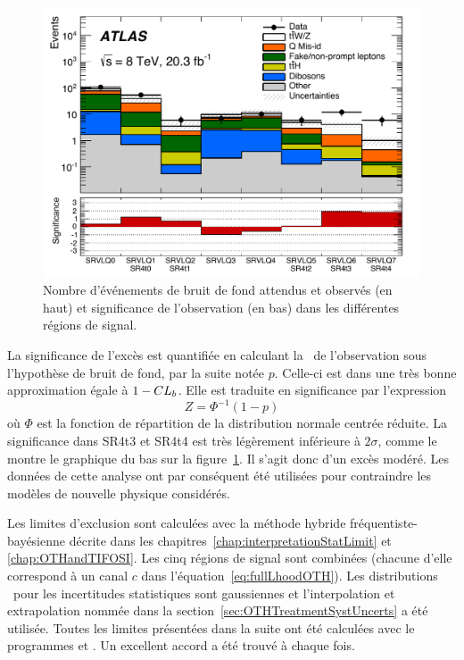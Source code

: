 \begin{figure}[!htb]
\begin{center}
\vspace*{-0.5cm}
\includegraphics[width=0.65\linewidth]{figures/paperSameSign/ExpectedBackgroundObeservedCategories.pdf}
\end{center}
\vspace*{-0.3cm}
\caption{Nombre d'\'ev\'enements de bruit de fond attendus et observ\'es (en haut) et significance de l'observation (en bas) dans les diff\'erentes r\'egions de signal.}
\label{fig:yieldsBkgSigPlusSignif}
\end{figure}

La significance de l'exc\`es est quantifi\'ee en calculant la \pval~de l'observation sous l'hypoth\`ese de bruit de fond, par la suite not\'ee $p$. 
Celle-ci est dans une tr\`es bonne approximation \'egale \`a $1-CL_b$. 
Elle est traduite en significance par l'expression
\[Z=\Phi^{-1}\left(1-p\right)\]
o\`u $\Phi$ est la fonction de r\'epartition de la distribution normale centr\'ee r\'eduite. 
La significance dans SR4t3 et SR4t4 est tr\`es l\'eg\`erement inf\'erieure \`a $2\sigma$, comme le montre le graphique du bas sur la figure~\ref{fig:yieldsBkgSigPlusSignif}. 
Il s'agit donc d'un exc\`es mod\'er\'e.
Les donn\'ees de cette analyse ont par cons\'equent \'et\'e utilis\'ees pour contraindre les mod\`eles de nouvelle physique consid\'er\'es. 

Les limites d'exclusion sont calcul\'ees avec la m\'ethode hybride fr\'equentiste-bay\'esienne d\'ecrite dans les chapitres~\ref{chap:interpretationStatLimit} et \ref{chap:OTHandTIFOSI}. 
Les cinq r\'egions de signal sont combin\'ees (chacune d'elle correspond \`a un canal $c$ dans l'\'equation~\ref{eq:fullLhoodOTH}). 
Les distributions \prior~pour les incertitudes statistiques sont gaussiennes et l'interpolation et extrapolation nomm\'ee \mclimit{} dans la section~\ref{sec:OTHTreatmentSystUncerts} a \'et\'e utilis\'ee. 
Toutes les limites pr\'esent\'ees dans la suite ont \'et\'e calcul\'ees avec le programmes \mclimit{} et \opthylic. Un excellent accord a \'et\'e trouv\'e \`a chaque fois.

